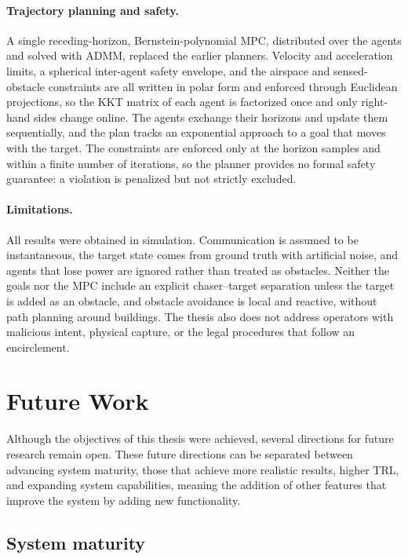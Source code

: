 \paragraph{Trajectory planning and safety.} 
A single receding-horizon, Bernstein-polynomial \gls{MPC}, distributed over the agents and solved with \gls{ADMM}, replaced the earlier planners. Velocity and acceleration limits, a spherical inter-agent safety envelope, and the airspace and sensed-obstacle constraints are all written in polar form and enforced through Euclidean projections, so the \gls{KKT} matrix of each agent is factorized once and only right-hand sides change online. The agents exchange their horizons and update them sequentially, and the plan tracks an exponential approach to a goal that moves with the target. The constraints are enforced only at the horizon samples and within a finite number of iterations, so the planner provides no formal safety guarantee: a violation is penalized but not strictly excluded.
 
\paragraph{Limitations.} 
All results were obtained in simulation. Communication is assumed to be instantaneous, the target state comes from ground truth with artificial noise, and agents that lose power are ignored rather than treated as obstacles. Neither the goals nor the \gls{MPC} include an explicit chaser--target separation unless the target is added as an obstacle, and obstacle avoidance is local and reactive, without path planning around buildings. The thesis also does not address operators with malicious intent, physical capture, or the legal procedures that follow an encirclement.

\section{Future Work}

Although the objectives of this thesis were achieved, several directions for future research remain open. These future directions can be separated between advancing system maturity, those that achieve more realistic results, higher \gls{TRL}, and expanding system capabilities, meaning the addition of other features that improve the system by adding new functionality.

\subsection{System maturity}

